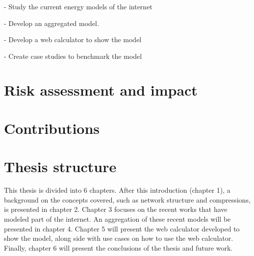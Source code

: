 - Study the current energy models of the internet

- Develop an aggregated model.

- Develop a web calculator to show the model

- Create case studies to benchmark the model


\section{Risk assessment and impact}

\section{Contributions}

\section{Thesis structure}

This thesis is divided into 6 chapters. After this introduction (chapter 1), a background on the concepts covered, such as network structure and compressions, is presented in chapter 2. Chapter 3 focuses on the recent works that have modeled part of the internet. An aggregation of these recent models will be presented in chapter 4. Chapter 5 will present the web calculator developed to show the model, along side with use cases on how to use the web calculator. Finally, chapter 6 will present the conclusions of the thesis and future work.


